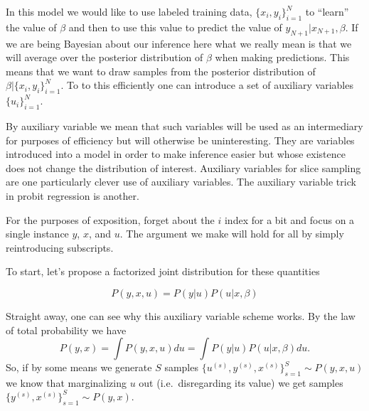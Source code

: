  In this model we would like to use labeled training data, $\{x_i, y_i\}_{i=1}^N$ to ``learn'' the value of $\beta$ and then to use this value to predict the value of $y_{N+1} | x_{N+1}, \beta.$  If we are being Bayesian about our inference here what we really mean is that we will average over the posterior distribution of $\beta$ when making predictions.  This means that we want to draw samples from the posterior distribution of $\beta | \{x_i, y_i\}_{i=1}^N$.  To to this efficiently one can introduce a set of auxiliary variables $\{u_i\}_{i=1}^N$.  

By auxiliary variable we mean that such variables will be used as an intermediary for purposes of efficiency but will otherwise be uninteresting.    They are variables introduced into a model in order to make inference easier but whose existence does not change the distribution of interest.  Auxiliary variables for slice sampling are one particularly clever use of auxiliary variables.  The auxiliary variable trick in probit regression is another.

For the purposes of exposition, forget about the $i$ index for a bit and focus on a single instance $y$, $x$, and $u$.  The argument we make will hold for all by simply reintroducing subscripts.  

To start, let's propose a factorized joint distribution for these quantities

\begin{equation}
P(y,x,u) = P(y|u)P(u|x,\beta) \label{eqn:joint}
\end{equation}

Straight away, one can see why this auxiliary variable scheme works.  By the law of total probability we have
\begin{equation}
P(y,x) = \int P(y,x,u)du= \int P(y|u)P(u|x,\beta)du.  \label{eqn:joint_marginalized}
\end{equation}
So, if by some means we generate $S$ samples $\{u^{(s)},y^{(s)},x^{(s)}\}_{s=1}^S \sim P(y,x,u)$ we know that marginalizing $u$ out (i.e.~disregarding its value) we get samples $\{y^{(s)},x^{(s)}\}_{s=1}^S \sim P(y,x).$  %

